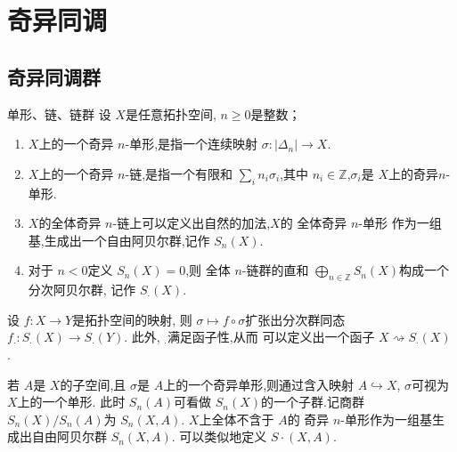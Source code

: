 \documentclass[../../几何与拓扑.tex]{subfiles}
\begin{document}
    
\chapter{奇异同调}

\section{奇异同调群}


\begin{definition}{单形、链、链群}
    设 \(  X  \)是任意拓扑空间, \(  n\ge 0  \)是整数；
    \begin{enumerate}
        \item  \(  X  \)上的一个奇异 \(  n  \)-单形,是指一个连续映射 \(   \sigma : \left|  \Delta _{n} \right|\to X   \).
        \item \(  X  \)上的一个奇异 \(  n  \)-链,是指一个有限和 \(  \sum _{i} n_{i} \sigma _i   \),其中 \(  n_{i}\in \mathbb{Z}  \),\(   \sigma _i   \)是 \(  X  \)上的奇异\(  n  \)-单形.
        \item \(  X  \)的全体奇异 \(  n  \)-链上可以定义出自然的加法,\(  X  \)的 全体奇异 \(  n  \)-单形 作为一组基,生成出一个自由阿贝尔群,记作 \(  S_{n}\left( X \right)   \).
        \item 对于 \(  n<0  \)定义 \(  S_{n}\left( X \right)= 0   \),则  全体 \(  n  \)-链群的直和 \(  \bigoplus _{ n \in \mathbb{Z}}S_{n}\left( X \right)   \)构成一个分次阿贝尔群, 记作 \(  S_{\cdot }\left( X \right)  \).                
    \end{enumerate}
      
\end{definition}



\begin{corollary}
    设 \(  f:X\to Y  \)是拓扑空间的映射, 则 \(   \sigma \mapsto f\circ  \sigma   \)扩张出分次群同态 \(  f_{\cdot }: S_{\cdot }\left( X \right)\to S_{\cdot }\left( Y \right)    \). 
    此外, \(  {}_{\cdot }  \)满足函子性,从而 可以定义出一个函子 \(  X \rightsquigarrow  S_{\cdot }\left( X \right)   \)  .
\end{corollary}

\begin{definition}
    若 \(  A  \)是 \(  X  \)的子空间,且 \(   \sigma   \)是 \(  A  \)上的一个奇异单形,则通过含入映射 \(  A \hookrightarrow X  \), \(   \sigma   \)可视为 \(  X  \)上的一个单形.
    此时 \(  S_{n}\left( A \right)   \)可看做 \(  S_{n}\left( X \right)   \)的一个子群.记商群 \(  S_{n}\left( X \right)/ S_{n}\left( A \right)    \)为 \(  S_{n}\left( X,A \right)   \).
    \(  X  \)上全体不含于 \(  A  \)的 奇异 \(  n  \)-单形作为一组基生成出自由阿贝尔群 \(  S_{n}\left( X,A \right)   \).  可以类似地定义 \(  S\cdot \left( X,A \right)   \).               
\end{definition}
\end{document}

